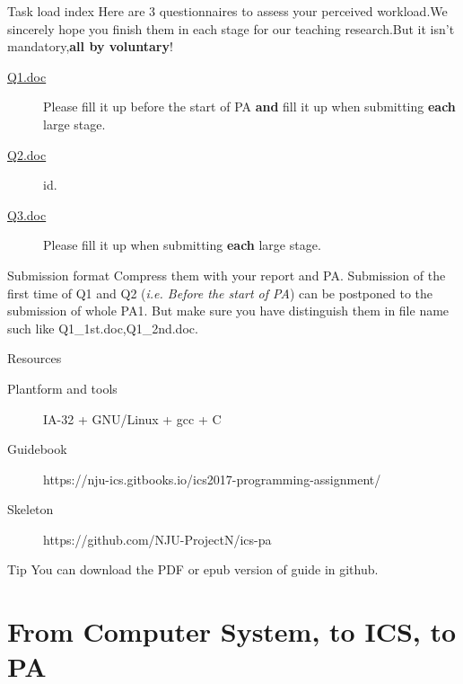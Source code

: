 \documentclass{beamer}
\begin{document}
\begin{frame}{Task load index}
	Here are 3 questionnaires to assess your perceived workload.\alert{We sincerely hope you finish them} in each stage for our teaching research.But it isn't mandatory,\textbf{all by voluntary}!
	\begin{description}
		\item 	[\href{https://github.com/xmh645214784/ics2017Slides/blob/master/introduction/Q1.doc}{Q1.doc}] Please fill it up before the start of PA \textbf{and} fill it up when submitting \textbf{each} large stage.
		\item	[\href{https://github.com/xmh645214784/ics2017Slides/blob/master/introduction/Q2.doc}{Q2.doc}] id.
		\item	[\href{https://github.com/xmh645214784/ics2017Slides/blob/master/introduction/Q3.doc}{Q3.doc}] Please fill it up when submitting \textbf{each} large stage.
	\end{description}
\begin{alertblock}{Submission format}
	Compress them with your report and PA. Submission of the first time of Q1 and Q2 (\textit{i.e. Before the start of PA}) can be postponed to the submission of whole PA1. But make sure you have distinguish them in file name such like Q1\_1st.doc,Q1\_2nd.doc.
\end{alertblock}
\end{frame}

\begin{frame}{Resources}
	\begin{description}
		\item [Plantform and tools] IA-32 + GNU/Linux + gcc + C
		\item [Guidebook] https://nju-ics.gitbooks.io/ics2017-programming-assignment/
		\item [Skeleton]https://github.com/NJU-ProjectN/ics-pa
	\end{description}
	\begin{alertblock}{Tip}
		You can download the PDF or epub version of guide in github.
	\end{alertblock}
\end{frame}


\section{From Computer System, to ICS, to PA}

\begin{frame}
\end{frame}
\end{document}
